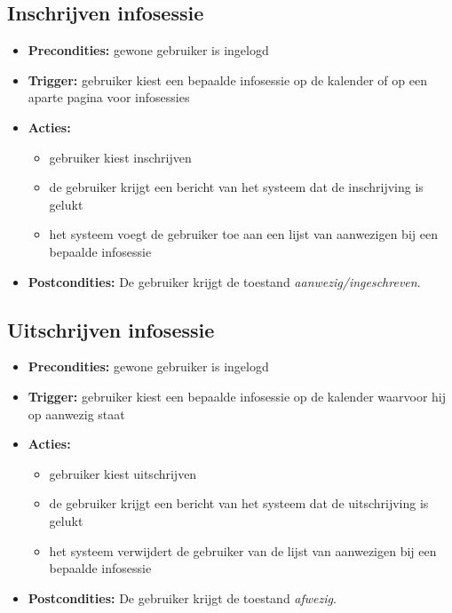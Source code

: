 \documentclass[11pt,a4paper,oneside]{article}
\begin{document}
\subsection{Inschrijven infosessie}
\begin{itemize}

\item \textbf{Precondities:} gewone gebruiker is ingelogd
\item \textbf{Trigger:} gebruiker kiest een bepaalde infosessie op de kalender of op een aparte pagina voor infosessies 
\item \textbf{Acties:} \begin{itemize}
\item	gebruiker kiest inschrijven
\item	de gebruiker krijgt een bericht van het systeem dat de inschrijving is gelukt
\item	het systeem voegt de gebruiker toe aan een lijst van aanwezigen bij een bepaalde infosessie
\end{itemize}
\item \textbf{Postcondities:} De gebruiker krijgt de toestand \emph{aanwezig/ingeschreven}.
\end{itemize}

\subsection{Uitschrijven infosessie}
\begin{itemize}

\item \textbf{Precondities:} gewone gebruiker is ingelogd
\item \textbf{Trigger:} gebruiker kiest een bepaalde infosessie op de kalender waarvoor hij op aanwezig staat 
\item \textbf{Acties:} \begin{itemize}
\item	gebruiker kiest uitschrijven
\item	de gebruiker krijgt een bericht van het systeem dat de uitschrijving is gelukt
\item	het systeem verwijdert de gebruiker van de lijst van aanwezigen bij een bepaalde infosessie
\end{itemize}
\item \textbf{Postcondities:} De gebruiker krijgt de toestand \emph{afwezig}.
\end{itemize}
\end{document}
